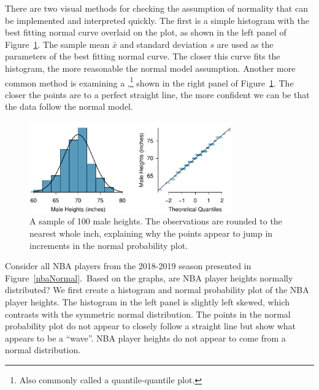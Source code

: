 There are two visual methods for checking the assumption of normality that can be implemented and interpreted quickly. The first is a simple histogram with the best fitting normal curve overlaid on the plot, as shown in the left panel of Figure~\ref{fcidMHeights}. The sample mean $\bar{x}$ and standard deviation $s$ are used as the parameters of the best fitting normal curve. The closer this curve fits the histogram, the more reasonable the normal model assumption. Another more common method is examining a ,\footnote{Also commonly called a quantile-quantile plot.} shown in the right panel of Figure~\ref{fcidMHeights}. The closer the points are to a perfect straight line, the more confident we can be that the data follow the normal model.

\begin{figure}[ht]
\centering
\includegraphics[width=0.78\textwidth]{ch_distributions/figures/fcidMHeights/fcidMHeights}
\caption{A sample of 100 male heights. The observations are rounded to the nearest whole inch, explaining why the points appear to jump in increments in the normal probability plot.}
\label{fcidMHeights}
\end{figure}


\begin{examplewrap}
\begin{nexample}{Consider all NBA players from the 2018-2019 season presented in Figure~\ref{nbaNormal}.\footnotemark\,  Based on the graphs, are NBA player heights normally distributed? }
We first create a histogram and normal probability plot of the NBA player heights. The histogram in the left panel is slightly left skewed, which contrasts with the symmetric normal distribution. The points in the normal probability plot do not appear to closely follow a straight line but show what appears to be a ``wave''. NBA player heights do not appear to come from a normal distribution.
\end{nexample}
\end{examplewrap}

